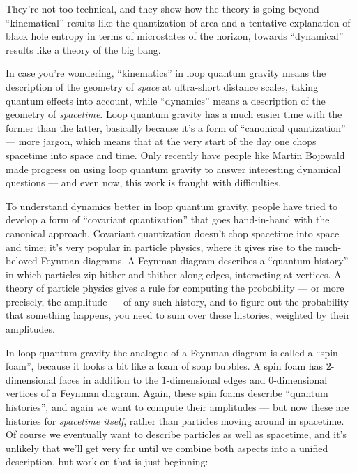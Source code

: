 \documentclass{article}
\renewcommand{\texttt}[1]{%
  \begingroup
  \ttfamily
  \begingroup\lccode`~=`/\lowercase{\endgroup\def~}{/\discretionary{}{}{}}%
  \begingroup\lccode`~=`[\lowercase{\endgroup\def~}{[\discretionary{}{}{}}%
  \begingroup\lccode`~=`.\lowercase{\endgroup\def~}{.\discretionary{}{}{}}%
  \catcode`/=\active\catcode`[=\active\catcode`.=\active
  \scantokens{#1\noexpand}%
  \endgroup
}
\begin{document}

They're not too technical, and they show how the theory is going beyond
``kinematical'' results like the quantization of area and a tentative
explanation of black hole entropy in terms of microstates of the
horizon, towards ``dynamical'' results like a theory of the big bang.

In case you're wondering, ``kinematics'' in loop quantum gravity means
the description of the geometry of \emph{space} at ultra-short distance
scales, taking quantum effects into account, while ``dynamics'' means a
description of the geometry of \emph{spacetime}. Loop quantum gravity
has a much easier time with the former than the latter, basically
because it's a form of ``canonical quantization'' --- more jargon, which
means that at the very start of the day one chops spacetime into space
and time. Only recently have people like Martin Bojowald made progress
on using loop quantum gravity to answer interesting dynamical questions
--- and even now, this work is fraught with difficulties.

To understand dynamics better in loop quantum gravity, people have tried
to develop a form of ``covariant quantization'' that goes hand-in-hand
with the canonical approach. Covariant quantization doesn't chop
spacetime into space and time; it's very popular in particle physics,
where it gives rise to the much-beloved Feynman diagrams. A Feynman
diagram describes a ``quantum history'' in which particles zip hither
and thither along edges, interacting at vertices. A theory of particle
physics gives a rule for computing the probability --- or more
precisely, the amplitude --- of any such history, and to figure out the
probability that something happens, you need to sum over these
histories, weighted by their amplitudes.

In loop quantum gravity the analogue of a Feynman diagram is called a
``spin foam'', because it looks a bit like a foam of soap bubbles. A
spin foam has \(2\)-dimensional faces in addition to the
\(1\)-dimensional edges and \(0\)-dimensional vertices of a Feynman
diagram. Again, these spin foams describe ``quantum histories'', and
again we want to compute their amplitudes --- but now these are
histories for \emph{spacetime itself}, rather than particles moving
around in spacetime. Of course we eventually want to describe particles
as well as spacetime, and it's unlikely that we'll get very far until we
combine both aspects into a unified description, but work on that is
just beginning:
\end{document}
